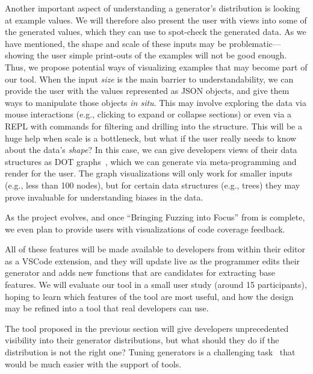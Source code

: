 Another important aspect of understanding a generator's distribution is looking
at example values. We will therefore also present the user with views into some
of the generated values, which they can use to spot-check the generated data. As
we have mentioned, the shape and scale of these inputs may be
problematic---showing the user simple print-outs of the examples will not be
good enough. Thus, we propose potential ways of visualizing examples that may
become part of our tool. 
When the input {\em size} is the main barrier to understandability, we can
provide the user with the values represented as JSON objects, and give them ways
to manipulate those objects {\em in situ}.  This may involve exploring the data
via mouse interactions (e.g., clicking to expand or collapse sections) or even
via a REPL with commands for filtering and drilling into the structure. This
will be a huge help when scale is a bottleneck, but what if the user really
needs to know about the data's {\em shape}?
In this case, we can give developers views of their data structures as DOT
graphs~\cite{ellson_graphviz_2002}, which we can generate via
meta-programming and render for the user. The graph visualizations will only
work for smaller inputs (e.g., less than 100 nodes), but for certain data
structures (e.g., trees) they may prove invaluable for understanding biases in
the data.

As the project evolves, and once ``Bringing Fuzzing into Focus'' from
 is complete, we even plan to provide users with
visualizations of code coverage feedback.


All of these features will be made available to developers from within their
editor as a VSCode extension, and they will update live as the programmer edits
their generator and adds new functions that are candidates for extracting base
features. We will evaluate our tool in a small user study (around 15
participants), hoping to learn which features of the tool are most useful, and
how the design may be refined into a tool that real developers can use.


The tool proposed in the previous section will give developers unprecedented
visibility into their generator distributions, but what should they do if the
distribution is not the right one? Tuning generators is a challenging task~\cn{}
that would be much easier with the support of tools.

